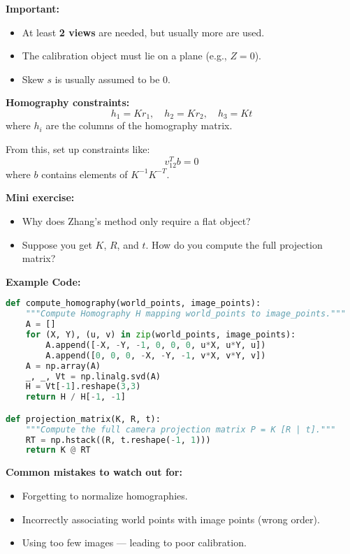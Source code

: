 \documentclass[a4paper,11pt]{article}
\begin{document}
\textbf{Important:}
\begin{itemize}
    \item At least \textbf{2 views} are needed, but usually more are used.
    \item The calibration object must lie on a plane (e.g., $Z=0$).
    \item Skew $s$ is usually assumed to be 0.
\end{itemize}

\textbf{Homography constraints:}
\[
h_1 = K r_1, \quad h_2 = K r_2, \quad h_3 = K t
\]
where $h_i$ are the columns of the homography matrix.

From this, set up constraints like:
\[
v_{12}^T b = 0
\]
where $b$ contains elements of $K^{-1}K^{-T}$.

\textbf{Mini exercise:}
\begin{itemize}
    \item Why does Zhang’s method only require a flat object?
    \item Suppose you get $K$, $R$, and $t$. How do you compute the full projection matrix?
\end{itemize}

\vspace{1em}

\textbf{Example Code:}
\begin{lstlisting}[language=Python]
def compute_homography(world_points, image_points):
    """Compute Homography H mapping world_points to image_points."""
    A = []
    for (X, Y), (u, v) in zip(world_points, image_points):
        A.append([-X, -Y, -1, 0, 0, 0, u*X, u*Y, u])
        A.append([0, 0, 0, -X, -Y, -1, v*X, v*Y, v])
    A = np.array(A)
    _, _, Vt = np.linalg.svd(A)
    H = Vt[-1].reshape(3,3)
    return H / H[-1, -1]

def projection_matrix(K, R, t):
    """Compute the full camera projection matrix P = K [R | t]."""
    RT = np.hstack((R, t.reshape(-1, 1)))
    return K @ RT
\end{lstlisting}

\vspace{1em}

\textbf{Common mistakes to watch out for:}
\begin{itemize}
    \item Forgetting to normalize homographies.
    \item Incorrectly associating world points with image points (wrong order).
    \item Using too few images — leading to poor calibration.
\end{itemize}
\end{document}
